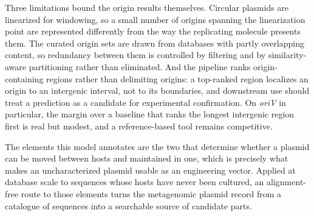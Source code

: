 Three limitations bound the origin results themselves. Circular plasmids are
linearized for windowing, so a small number of origins spanning the
linearization point are represented differently from the way the replicating
molecule presents them. The curated origin sets are drawn from databases with
partly overlapping content, so redundancy between them is controlled by
filtering and by similarity-aware partitioning rather than eliminated. And the
pipeline ranks origin-containing regions rather than delimiting origins: a
top-ranked region localizes an origin to an intergenic interval, not to its
boundaries, and downstream use should treat a prediction as a candidate for
experimental confirmation. On \emph{oriV} in particular, the margin over a
baseline that ranks the longest intergenic region first is real but modest,
and a reference-based tool remains competitive.

The elements this model annotates are the two that determine whether a plasmid
can be moved between hosts and maintained in one, which is precisely what
makes an uncharacterized plasmid usable as an engineering vector. Applied at
database scale to sequences whose hosts have never been cultured, an
alignment-free route to those elements turns the metagenomic plasmid record
from a catalogue of sequences into a searchable source of candidate parts.
